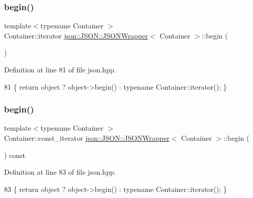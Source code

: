 \subsubsection{\texorpdfstring{begin()}{begin()}\hspace{0.1cm}{\footnotesize\ttfamily [1/2]}}
{\footnotesize\ttfamily template$<$typename Container $>$ \\
Container\+::iterator \mbox{\hyperlink{classjson_1_1_j_s_o_n_1_1_j_s_o_n_wrapper}{json\+::\+J\+S\+O\+N\+::\+J\+S\+O\+N\+Wrapper}}$<$ Container $>$\+::begin (\begin{DoxyParamCaption}{ }\end{DoxyParamCaption})\hspace{0.3cm}{\ttfamily [inline]}}



Definition at line 81 of file json.\+hpp.


\begin{DoxyCode}
81 \{ \textcolor{keywordflow}{return} \textcolor{keywordtype}{object} ? \textcolor{keywordtype}{object}->begin() : \textcolor{keyword}{typename} Container::iterator(); \}
\end{DoxyCode}
\mbox{\label{classjson_1_1_j_s_o_n_1_1_j_s_o_n_wrapper_a8290666f91b9232eb6e3a2ffaad0949d}} 
\subsubsection{\texorpdfstring{begin()}{begin()}\hspace{0.1cm}{\footnotesize\ttfamily [2/2]}}
{\footnotesize\ttfamily template$<$typename Container $>$ \\
Container\+::const\+\_\+iterator \mbox{\hyperlink{classjson_1_1_j_s_o_n_1_1_j_s_o_n_wrapper}{json\+::\+J\+S\+O\+N\+::\+J\+S\+O\+N\+Wrapper}}$<$ Container $>$\+::begin (\begin{DoxyParamCaption}{ }\end{DoxyParamCaption}) const\hspace{0.3cm}{\ttfamily [inline]}}



Definition at line 83 of file json.\+hpp.


\begin{DoxyCode}
83 \{ \textcolor{keywordflow}{return} \textcolor{keywordtype}{object} ? \textcolor{keywordtype}{object}->begin() : \textcolor{keyword}{typename} Container::iterator(); \}
\end{DoxyCode}
\mbox{\label{classjson_1_1_j_s_o_n_1_1_j_s_o_n_wrapper_aaedcc93307ac3f1abd057cd95c4418b3}} 
